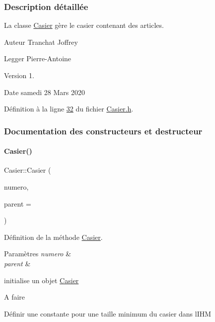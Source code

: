 \subsubsection{Description détaillée}
La classe \hyperlink{class_casier}{Casier} gère le casier contenant des articles. 

\begin{DoxyAuthor}{Auteur}
Tranchat Joffrey 

Legger Pierre-\/\+Antoine
\end{DoxyAuthor}
\begin{DoxyVersion}{Version}
1.
\end{DoxyVersion}
\begin{DoxyDate}{Date}
samedi 28 Mars 2020 
\end{DoxyDate}


Définition à la ligne \hyperlink{_casier_8h_source_l00032}{32} du fichier \hyperlink{_casier_8h_source}{Casier.\+h}.



\subsubsection{Documentation des constructeurs et destructeur}
\mbox{\label{class_casier_aed1cd4435ff913a68b69d8119481bb8f}} 
\paragraph{\texorpdfstring{Casier()}{Casier()}}
{\footnotesize\ttfamily Casier\+::\+Casier (\begin{DoxyParamCaption}\item[{int}]{numero,  }\item[{Q\+Widget $\ast$}]{parent = {} }\end{DoxyParamCaption})}



Définition de la méthode \hyperlink{class_casier}{Casier}. 


\begin{DoxyParams}{Paramètres}
{\em numero} & \\
\hline
{\em parent} & \\
\hline
\end{DoxyParams}
initialise un objet \hyperlink{class_casier}{Casier} \begin{DoxyRefDesc}{A faire}
\item[\hyperlink{todo__todo000001}{A faire}]Définir une constante pour une taille minimum du casier dans l\textquotesingle{}I\+HM \end{DoxyRefDesc}


